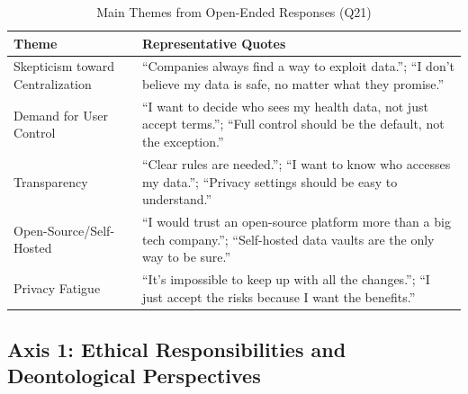 		\begin{table}[ht]
			\caption{Main Themes from Open-Ended Responses (Q21)}
			\centering
			\begin{tabular}{p{3.5cm}p{11cm}}
				\toprule
				\textbf{Theme} & \textbf{Representative Quotes} \\
				\midrule
				Skepticism toward Centralization & “Companies always find a way to exploit data.”; “I don’t believe my data is safe, no matter what they promise.” \\
				Demand for User Control & “I want to decide who sees my health data, not just accept terms.”; “Full control should be the default, not the exception.” \\
				Transparency & “Clear rules are needed.”; “I want to know who accesses my data.”; “Privacy settings should be easy to understand.” \\
				Open-Source/Self-Hosted & “I would trust an open-source platform more than a big tech company.”; “Self-hosted data vaults are the only way to be sure.” \\
				Privacy Fatigue & “It’s impossible to keep up with all the changes.”; “I just accept the risks because I want the benefits.” \\
				\bottomrule
			\end{tabular}
			\label{tab:qualitative_themes}
		\end{table}
\subsection{Axis 1: Ethical Responsibilities and Deontological Perspectives}
